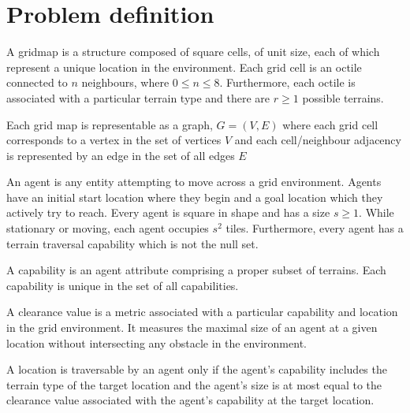 \section{Problem definition}
\begin{definition}
A gridmap is a structure composed of square cells, of unit size, each of which represent a unique location in the environment. Each grid cell is an octile connected to $n$ neighbours, where  $0 \leq n \leq 8$. Furthermore, each octile is associated with a particular terrain type and there are $r \geq 1$ possible terrains.
\end{definition}

\begin{definition}
Each grid map is representable as a graph, $G = (V, E)$ where each grid cell corresponds to a vertex in the set of vertices $V$ and each cell/neighbour adjacency is represented by an edge in the set of all edges $E$
\end{definition}

\begin{definition}
An agent is any entity attempting to move across a grid environment. Agents have an initial start location where they begin and a goal location which they actively try to reach. Every agent is square in shape and has a size $s \geq 1$. While stationary or moving, each agent occupies $s^2$ tiles. Furthermore, every agent has a terrain traversal capability which is not the null set.
\end{definition}


\begin{definition}
A capability is an agent attribute comprising a proper subset of terrains. Each capability is unique in the set of all capabilities. 
\end{definition}

\begin{definition}A clearance value is a metric associated with a particular capability and location in the grid environment. It measures the maximal size of an agent at a given location without intersecting any obstacle in the environment. 
\end{definition}

\begin{definition}
A location is traversable by an agent only if the agent's capability includes the terrain type of the target location and the agent's size is at most equal to the  clearance value associated with the agent's capability at the target location. 
\end{definition}


